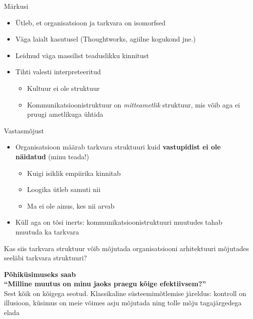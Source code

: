 \documentclass{beamer}
\begin{document}
\begin{frame}{Märkusi}
	\begin{itemize}
		\item Ütleb, et  organisatsioon ja tarkvara on isomorfsed
		\item Väga laialt kasutusel (Thoughtworks, agiilne kogukond jne.)
		\item Leidnud väga massilist teaduslikku kinnitust
		\item Tihti valesti interpreteeritud
		\begin{itemize}
			\item Kultuur ei ole struktuur
			\item Kommunikatsioonistruktuur on \emph{mitteametlik} struktuur, mis võib aga ei pruugi ametlikuga ühtida
		\end{itemize}
	\end{itemize}
\end{frame}

\begin{frame}{Vastasmõjust}
	\begin{itemize}
		\item Organisatsioon määrab tarkvara struktuuri kuid \textbf{vastupidist ei ole näidatud} (minu teada!)
		\begin{itemize}
			\item Kuigi isiklik empiirika kinnitab
			\item Loogika ütleb samuti nii
			\item Ma ei ole ainus, kes nii arvab
		\end{itemize}
		\item Küll aga on tõsi inerts: kommunikatsioonistruktuuri muutudes tahab muutuda ka tarkvara
	\end{itemize}
	\begin{center}
		Kas siis tarkvara struktuur võib mõjutada organisatsiooni arhitektuuri mõjutades seeläbi tarkvara struktuuri? 
	\end{center}
\end{frame}

\begin{frame}[fragile]
	\begin{center}
		\LARGE{\textbf{Põhiküsimuseks saab\\\enquote{Milline muutus on minu jaoks praegu kõige efektiivsem?}}}
		\\[4cm]
		\small{Sest kõik on kõigega seotud. Klassikaline süsteemimõtlemise järeldus: kontroll on illusioon, küsimus on meie võimes asju mõjutada ning tolle mõju tagajärgedega elada}
	\end{center}
\end{frame}
\end{document}
